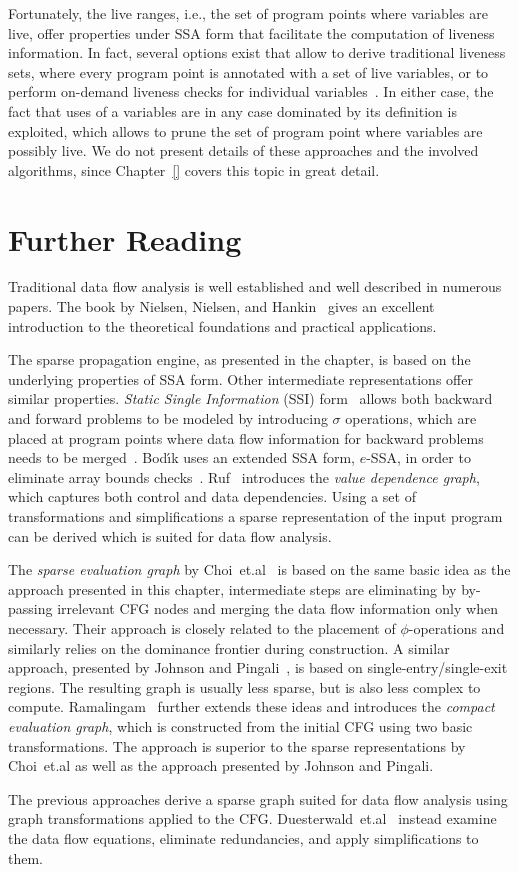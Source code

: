 Fortunately, the live ranges, i.e., the set of program points where variables
are live, offer properties under SSA form that facilitate the computation of
liveness information. In fact, several options exist that allow to derive
traditional liveness sets, where every program point is annotated with a set of
live variables, or to perform on-demand liveness checks for individual
variables~\cite{novillo:bib:BHGD08}. In either case, the fact that uses of a
variables are in any case dominated by its definition is exploited, which allows
to prune the set of program point where variables are possibly live. We do not
present details of these approaches and the involved algorithms, since
Chapter~\ref{} covers this topic in great detail.

\section{Further Reading}
\label{novillo:sec:further_reading}

Traditional data flow analysis is well established and well described in
numerous papers. The book by Nielsen, Nielsen, and
Hankin~\cite{novillo:bib:NNH99} gives an excellent introduction to the
theoretical foundations and practical applications.

The sparse propagation engine, as presented in the chapter, is based on the
underlying properties of SSA form. Other intermediate representations offer
similar properties. \emph{Static Single Information} (SSI)
form~\cite{novillo:bib:S05} allows both backward and forward problems to be
modeled by introducing $\sigma$ operations, which are placed at program points
where data flow information for backward problems needs to be
merged~\cite{novillo:bib:S04}. Bod\'{\i}k uses an extended SSA form, $e$-SSA,
in order to eliminate array bounds checks~\cite{novillo:bib:BGV00}.
Ruf~\cite{novillo:bib:R95} introduces the \emph{value dependence graph}, which
captures both control and data dependencies. Using a set of transformations and
simplifications a sparse representation of the input program can be derived
which is suited for data flow analysis.

The \emph{sparse evaluation graph} by Choi~et.al~\cite{novillo:bib:CCF91} is
based on the same basic idea as the approach presented in this chapter,
intermediate steps are eliminating by by-passing irrelevant CFG nodes and
merging the data flow information only when necessary. Their approach is closely
related to the placement of $\phi$-operations and similarly relies on the
dominance frontier during construction. A similar approach, presented by Johnson
and Pingali~\cite{novillo:bib:JO93}, is based on single-entry/single-exit
regions. The resulting graph is usually less sparse, but is also less complex to
compute. Ramalingam~\cite{novillo:bib:R02} further extends these ideas and
introduces the \emph{compact evaluation graph}, which is constructed from the
initial CFG using two basic transformations. The approach is superior to the
sparse representations by Choi~et.al as well as the approach presented by
Johnson and Pingali.

The previous approaches derive a sparse graph suited for data flow analysis
using graph transformations applied to the CFG.
Duesterwald~et.al~\cite{novillo:bib:DGS94} instead examine the data flow
equations, eliminate redundancies, and apply simplifications to them.

